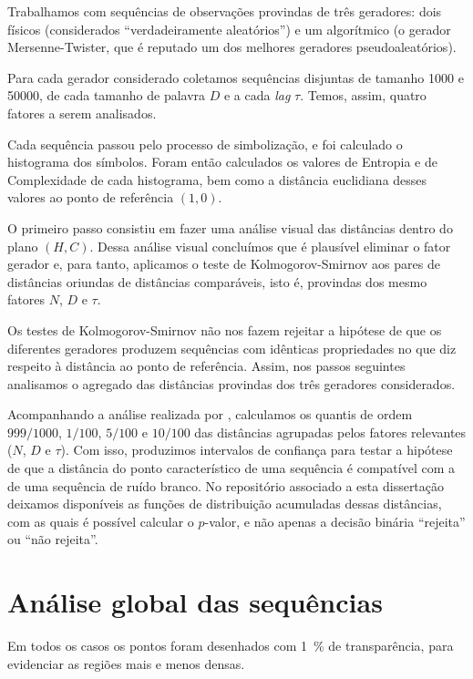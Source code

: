 

Trabalhamos com sequências de observações provindas de três geradores: dois físicos (considerados ``verdadeiramente aleatórios'') e um algorítmico (o gerador Mersenne-Twister, que é reputado um dos melhores geradores pseudoaleatórios).

Para cada gerador considerado coletamos sequências disjuntas de tamanho \num{1000} e \num{50000}, de cada tamanho de palavra $D$ e a cada \textit{lag} $\tau$.
Temos, assim, quatro fatores a serem analisados.

Cada sequência passou pelo processo de simbolização, e foi calculado o histograma dos símbolos.
Foram então calculados os valores de Entropia e de Complexidade de cada histograma, bem como a distância euclidiana desses valores ao ponto de referência $(1,0)$.

O primeiro passo consistiu em fazer uma análise visual das distâncias dentro do plano $(H,C)$.
Dessa análise visual concluímos que é plausível eliminar o fator gerador e, para tanto, aplicamos o teste de Kolmogorov-Smirnov aos pares de distâncias oriundas de distâncias comparáveis, isto é, provindas dos mesmo fatores $N$, $D$ e $\tau$.

Os testes de Kolmogorov-Smirnov não nos fazem rejeitar a hipótese de que os diferentes geradores produzem sequências com idênticas propriedades no que diz respeito à distância ao ponto de referência.
Assim, nos passos seguintes analisamos o agregado das distâncias provindas dos três geradores considerados.

Acompanhando a análise realizada por \citet{NewPermutationEntropy}, calculamos os quantis de ordem $999/1000$, $1/100$, $5/100$ e $10/100$ das distâncias agrupadas pelos fatores relevantes ($N$, $D$ e $\tau$).
Com isso, produzimos intervalos de confiança para testar a hipótese de que a
distância do ponto característico de uma sequência é compatível com a de uma sequência de ruído branco.
No repositório associado a esta dissertação deixamos disponíveis as funções de distribuição acumuladas dessas distâncias, com as quais é possível calcular o $p$-valor, e não apenas a decisão binária ``rejeita'' ou ``não rejeita''.

\section{Análise global das sequências}

Em todos os casos os pontos foram desenhados com \SI{1}{\percent} de transparência, para evidenciar as regiões mais e menos densas.

